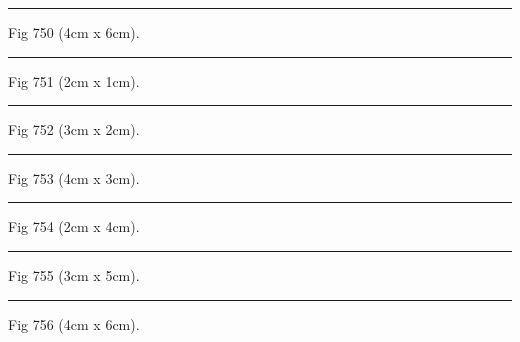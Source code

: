 \documentclass[a4paper,11pt]{article}
\begin{document}
\begin{swarmwrap}%
  \begin{minipage}[t]{4cm}
    \centering
    \rule{\linewidth}{6cm}
    {\footnotesize Fig 750 (4cm x 6cm).}
  \end{minipage}%
\end{swarmwrap}%
\swarmwrapnext
\lipsum[150]%

\begin{swarmwrap}%
  \begin{minipage}[t]{2cm}
    \centering
    \rule{\linewidth}{1cm}
    {\footnotesize Fig 751 (2cm x 1cm).}
  \end{minipage}%
\end{swarmwrap}%
\swarmwrapnext
\lipsum[1]%

\begin{swarmwrap}%
  \begin{minipage}[t]{3cm}
    \centering
    \rule{\linewidth}{2cm}
    {\footnotesize Fig 752 (3cm x 2cm).}
  \end{minipage}%
\end{swarmwrap}%
\swarmwrapnext
\lipsum[2]%

\begin{swarmwrap}%
  \begin{minipage}[t]{4cm}
    \centering
    \rule{\linewidth}{3cm}
    {\footnotesize Fig 753 (4cm x 3cm).}
  \end{minipage}%
\end{swarmwrap}%
\swarmwrapnext
\lipsum[3]%

\begin{swarmwrap}%
  \begin{minipage}[t]{2cm}
    \centering
    \rule{\linewidth}{4cm}
    {\footnotesize Fig 754 (2cm x 4cm).}
  \end{minipage}%
\end{swarmwrap}%
\swarmwrapnext
\lipsum[4]%

\begin{swarmwrap}%
  \begin{minipage}[t]{3cm}
    \centering
    \rule{\linewidth}{5cm}
    {\footnotesize Fig 755 (3cm x 5cm).}
  \end{minipage}%
\end{swarmwrap}%
\swarmwrapnext
\lipsum[5]%

\begin{swarmwrap}%
  \begin{minipage}[t]{4cm}
    \centering
    \rule{\linewidth}{6cm}
    {\footnotesize Fig 756 (4cm x 6cm).}
  \end{minipage}%
\end{swarmwrap}%
\swarmwrapnext
\lipsum[6]%
\end{document}
